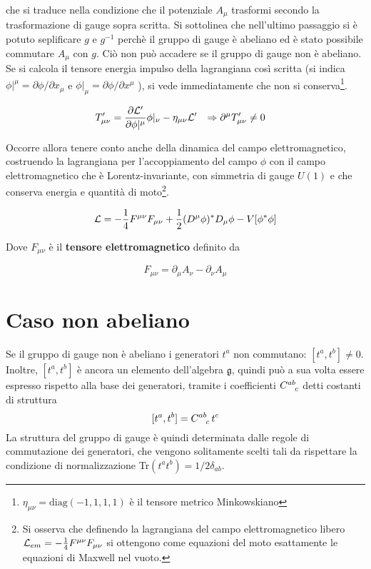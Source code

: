 che si traduce nella condizione che il potenziale $A _\mu$ trasformi secondo la
trasformazione di gauge sopra scritta.
Si sottolinea che nell'ultimo passaggio si è potuto seplificare $g$ e $ g^{-1} $
perchè il gruppo di gauge è abeliano ed è stato possibile commutare $ A _\mu $
con $g$. Ciò non può accadere se il gruppo di gauge non è abeliano.  \\

Se si calcola il tensore energia impulso della lagrangiana così scritta (si indica
$\phi| ^{\mu} = \partial \phi / \partial x_\mu$ e
$\phi| _{\mu} = \partial \phi / \partial x^\mu$ ), si vede immediatamente che non si
conserva\footnote{
   $\eta _{\mu\nu} = \mathrm{diag}(-1,1,1,1)$ è il tensore metrico Minkowskiano
}.

\begin{equation}
   \begin{aligned}
      T'_{\mu\nu} & = \frac{\partial \mathcal{L}'}{\partial \phi|^{\mu}}\phi|_{\nu}
      - \eta _{\mu\nu} \mathcal{L}' &
      \Rightarrow \partial ^\mu T'_{\mu\nu} & \neq 0
   \end{aligned}
\end{equation}

Occorre allora tenere conto anche della dinamica del campo elettromagnetico, costruendo
la lagrangiana per l'accoppiamento del campo $\phi$ con il campo elettromagnetico
che è Lorentz-invariante, con simmetria di gauge $U(1)$ e che conserva energia e
quantità di moto\footnote{
   Si osserva che definendo la lagrangiana del campo elettromagnetico libero
   $
      \mathcal{L} _{em} = - \frac{1}{4}F^{\mu\nu} F_{\mu\nu}
   $
   si ottengono come equazioni del moto esattamente le equazioni di Maxwell nel vuoto.
}.

\begin{equation}
\mathcal{L} = -\frac{1}{4} F^{\mu\nu}F_{\mu\nu}
+ \frac{1}{2} (D^\mu \phi)^* D _\mu \phi - V[\phi^* \phi]
\end{equation}

Dove $F_{\mu\nu}$ è il \textbf{tensore elettromagnetico} definito da

$$
   F_{\mu\nu} = \partial _\mu A _\nu - \partial _\nu A _\mu
$$

\section{Caso non abeliano}
Se il gruppo di gauge non è abeliano i generatori $t^a$ non commutano: $[t^a,t^b] \neq 0$.
Inoltre, $[t^a,t^b]$ è ancora un elemento dell'algebra $\mathfrak{g}$, quindi può a sua
volta essere espresso rispetto alla base dei generatori, tramite i coefficienti
$C^{ab}_{\hphantom{ab}c}$ detti costanti di struttura
$$
   [t^a,t^b] = C^{ab}_{\hphantom{ab}c} \, t^c
$$
La struttura del gruppo di gauge è quindi determinata dalle regole di commutazione
dei generatori, che vengono solitamente scelti tali da rispettare la condizione di
normalizzazione Tr$(t^a t^b) = 1/2 \delta_{ab}$.\\

